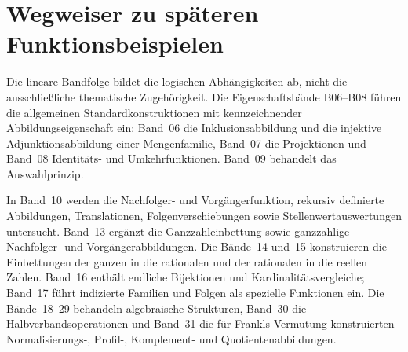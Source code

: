 \documentclass[main.tex]{subfiles}
\begin{document}
\begin{tabproof}








\end{tabproof}



\chapter{Wegweiser zu späteren Funktionsbeispielen}

Die lineare Bandfolge bildet die logischen Abhängigkeiten ab, nicht die
ausschließliche thematische Zugehörigkeit. Die Eigenschaftsbände B06--B08
führen die allgemeinen Standardkonstruktionen mit kennzeichnender
Abbildungseigenschaft ein: Band~06 die Inklusionsabbildung und die injektive
Adjunktionsabbildung einer Mengenfamilie, Band~07 die Projektionen und
Band~08 Identitäts- und Umkehrfunktionen. Band~09 behandelt das
Auswahlprinzip.

In Band~10 werden die Nachfolger- und Vorgängerfunktion, rekursiv definierte
Abbildungen, Translationen, Folgenverschiebungen sowie
Stellenwertauswertungen untersucht. Band~13 ergänzt die Ganzzahleinbettung
sowie ganzzahlige Nachfolger- und Vorgängerabbildungen. Die Bände~14 und~15
konstruieren die Einbettungen der ganzen in die rationalen und der rationalen
in die reellen Zahlen. Band~16 enthält endliche Bijektionen und
Kardinalitätsvergleiche; Band~17 führt indizierte Familien und Folgen als
spezielle Funktionen ein. Die Bände~18--29 behandeln algebraische
Strukturen, Band~30 die Halbverbandsoperationen und Band~31 die für Frankls
Vermutung konstruierten
Normalisierungs-, Profil-, Komplement- und Quotientenabbildungen.
\end{document}
